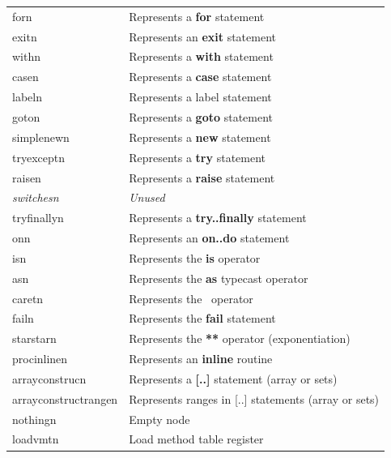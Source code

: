 \documentclass [a4paper,12pt]{article}
\begin{document}
\begin{longtable}{|l|p{10cm}|}
\textsf{forn}&
        \textsf{Represents a }\textsf{\textbf{for}}\textsf{ statement} \\
\textsf{exitn}&
        \textsf{Represents an }\textsf{\textbf{exit}}\textsf{ statement} \\
\textsf{withn}&
        \textsf{Represents a }\textsf{\textbf{with}}\textsf{ statement} \\
\textsf{casen}&
        \textsf{Represents a }\textsf{\textbf{case}}\textsf{ statement} \\
\textsf{labeln}&
        \textsf{Represents a label statement} \\
\textsf{goton}&
        \textsf{Represents a }\textsf{\textbf{goto}}\textsf{ statement} \\
\textsf{simplenewn}&
        \textsf{Represents a }\textsf{\textbf{new}}\textsf{ statement } \\
\textsf{tryexceptn}&
        \textsf{Represents a }\textsf{\textbf{try}}\textsf{ statement} \\
\textsf{raisen}&
        \textsf{Represents a }\textsf{\textbf{raise}}\textsf{ statement} \\
\textsf{\textit{switchesn}}&
        \textsf{\textit{Unused}} \\
\textsf{tryfinallyn}&
        \textsf{Represents a }\textsf{\textbf{try..finally}}\textsf{ statement} \\
\textsf{onn}&
        \textsf{Represents an }\textsf{\textbf{on..do}}\textsf{ statement} \\
\textsf{isn}&
        \textsf{Represents the }\textsf{\textbf{is}}\textsf{ operator} \\
\textsf{asn}&
        \textsf{Represents the }\textsf{\textbf{as}}\textsf{ typecast operator} \\
\textsf{caretn}&
        \textsf{Represents the \  operator} \\
\textsf{failn}&
        \textsf{Represents the }\textsf{\textbf{fail}}\textsf{ statement} \\
\textsf{starstarn}&
        \textsf{Represents the }\textsf{\textbf{**}}\textsf{ operator (exponentiation)} \\
\textsf{procinlinen}&
        \textsf{Represents an }\textsf{\textbf{inline}}\textsf{ routine} \\
\textsf{arrayconstrucn}&
        \textsf{Represents a }\textsf{\textbf{[..]}}\textsf{ statement (array or sets)} \\
\textsf{arrayconstructrangen}&
        \textsf{Represents ranges in [..] statements (array or sets)} \\
\textsf{nothingn}&
        \textsf{Empty node} \\
\textsf{loadvmtn}&
        \textsf{Load method table register} \\
\hline
\end{longtable}
\end{document}
